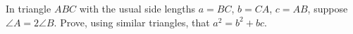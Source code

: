 In triangle $ABC$ with the usual side lengths $a=BC$, $b=CA$, $c=AB$, suppose $\angle A=2\angle B$. Prove, using similar triangles, that $a^2=b^2+bc$.
